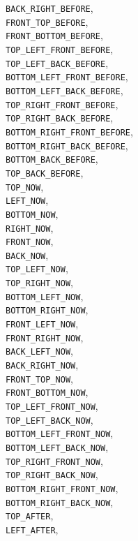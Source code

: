 \documentclass[10pt]{article}
\begin{document}
	\verb+BACK_RIGHT_BEFORE+,\\
	\verb+FRONT_TOP_BEFORE+,\\
	\verb+FRONT_BOTTOM_BEFORE+,\\
	\verb+TOP_LEFT_FRONT_BEFORE+,\\
	\verb+TOP_LEFT_BACK_BEFORE+,\\
	\verb+BOTTOM_LEFT_FRONT_BEFORE+,\\
	\verb+BOTTOM_LEFT_BACK_BEFORE+,\\
	\verb+TOP_RIGHT_FRONT_BEFORE+,\\
	\verb+TOP_RIGHT_BACK_BEFORE+,\\
	\verb+BOTTOM_RIGHT_FRONT_BEFORE+,\\
	\verb+BOTTOM_RIGHT_BACK_BEFORE+,\\
	\verb+BOTTOM_BACK_BEFORE+,\\
	\verb+TOP_BACK_BEFORE+,	\\
	\verb+TOP_NOW+,\\
	\verb+LEFT_NOW+,\\
	\verb+BOTTOM_NOW+,\\
	\verb+RIGHT_NOW+,\\
	\verb+FRONT_NOW+,\\
	\verb+BACK_NOW+,\\
	\verb+TOP_LEFT_NOW+,\\
	\verb+TOP_RIGHT_NOW+,\\
	\verb+BOTTOM_LEFT_NOW+,\\
	\verb+BOTTOM_RIGHT_NOW+,\\
	\verb+FRONT_LEFT_NOW+,\\
	\verb+FRONT_RIGHT_NOW+,\\
	\verb+BACK_LEFT_NOW+,\\
	\verb+BACK_RIGHT_NOW+,\\
	\verb+FRONT_TOP_NOW+,\\
	\verb+FRONT_BOTTOM_NOW+,\\
	\verb+TOP_LEFT_FRONT_NOW+,\\
	\verb+TOP_LEFT_BACK_NOW+,\\
	\verb+BOTTOM_LEFT_FRONT_NOW+,\\
	\verb+BOTTOM_LEFT_BACK_NOW+,\\
	\verb+TOP_RIGHT_FRONT_NOW+,\\
	\verb+TOP_RIGHT_BACK_NOW+,\\
	\verb+BOTTOM_RIGHT_FRONT_NOW+,\\
	\verb+BOTTOM_RIGHT_BACK_NOW+,\\
	\verb+TOP_AFTER+,\\
	\verb+LEFT_AFTER+,\\
\end{document}
